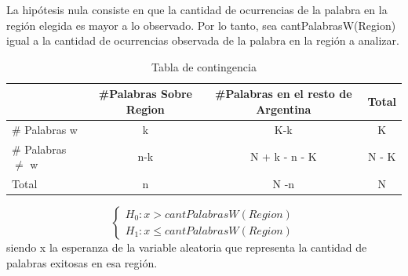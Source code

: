 La hipótesis nula consiste en que la cantidad de ocurrencias de la palabra en la región elegida es mayor a lo observado. 
Por lo tanto, sea  cantPalabrasW(Region) igual a la cantidad de ocurrencias observada de la palabra en la región a analizar.


\begin{table}[ht]
\centering
\label{tab:contingencia}
\begin{tabular}{lccc}
\hline
& \#Palabras Sobre Region &\#Palabras en el resto de Argentina &Total \\ \hline
\# Palabras w &   k & K-k & K \\ 
\# Palabras $\neq$ w & n-k & N + k - n - K  & N - K \\ 
Total & n & N -n & N \\ \hline
\end{tabular}
\caption{Tabla de contingencia}

\end{table}



$$
\begin{cases}
H_0 :  x > cantPalabrasW(Region) \\
H_1 : x \leq cantPalabrasW(Region)
\end{cases}
$$  
siendo x la esperanza de la variable aleatoria que representa la cantidad de palabras exitosas en esa región.
